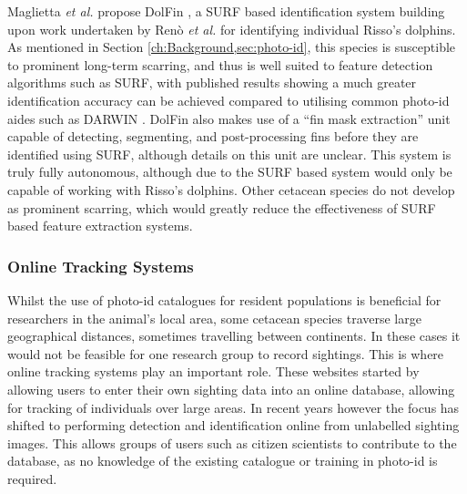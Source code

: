 Maglietta \textit{et al.} propose DolFin \cite{maglietta_dolfin_2018}, a SURF based identification system \cite{bay_speeded-up_2008} building upon work undertaken by Renò \textit{et al.} \cite{reno_sift-based_2019} for identifying individual Risso's dolphins. As mentioned in Section \ref{ch:Background,sec:photo-id}, this species is susceptible to prominent long-term scarring, and thus is well suited to feature detection algorithms such as SURF, with published results showing a much greater identification accuracy can be achieved compared to utilising common photo-id aides such as DARWIN \cite{hale_unsupervised_2012}. DolFin also makes use of a ``fin mask extraction'' unit capable of detecting, segmenting, and post-processing fins before they are identified using SURF, although details on this unit are unclear. This system is truly fully autonomous, although due to the SURF based system would only be capable of working with Risso's dolphins. Other cetacean species do not develop as prominent scarring, which would greatly reduce the effectiveness of SURF based feature extraction systems. 

\subsubsection{Online Tracking Systems}\label{ch:Background,sec:conTech,sub:photoIDAides,subsub:OnlineTracking}

Whilst the use of photo-id catalogues for resident populations is beneficial for researchers in the animal's local area, some cetacean species traverse large geographical distances, sometimes travelling between continents. In these cases it would not be feasible for one research group to record sightings. This is where online tracking systems play an important role. These websites started by allowing users to enter their own sighting data into an online database, allowing for tracking of individuals over large areas. In recent years however the focus has shifted to performing detection and identification online from unlabelled sighting images. This allows groups of users such as citizen scientists to contribute to the database, as no knowledge of the existing catalogue or training in photo-id is required.

